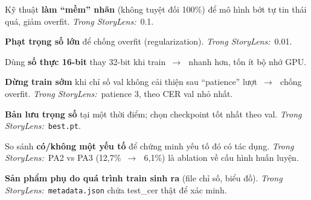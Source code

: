\documentclass[11pt]{article}
\newcommand{\arr}{\,\ensuremath{\rightarrow}\,}
\newcommand{\code}[1]{\texttt{\small #1}}
\newcommand{\insl}{\textit{\textcolor{steel}{Trong StoryLens:}}\ }
\begin{document}
\begin{terms}
\item[Label smoothing.] Kỹ thuật \textbf{làm ``mềm'' nhãn} (không tuyệt đối 100\%) để mô hình bớt tự tin thái quá, giảm overfit. \insl 0.1.
\item[Weight decay.] \textbf{Phạt trọng số lớn} để chống overfit (regularization). \insl 0.01.
\item[fp16 (mixed precision).] Dùng \textbf{số thực 16-bit} thay 32-bit khi train \arr\ nhanh hơn, tốn ít bộ nhớ GPU.
\item[Early stopping / Patience.] \textbf{Dừng train sớm} khi chỉ số val không cải thiện sau ``patience'' lượt \arr\ chống overfit. \insl patience 3, theo CER val nhỏ nhất.
\item[Checkpoint.] \textbf{Bản lưu trọng số} tại một thời điểm; chọn checkpoint tốt nhất theo val. \insl \code{best.pt}.
\item[Ablation study.] So sánh \textbf{có/không một yếu tố} để chứng minh yếu tố đó có tác dụng. \insl PA2 vs PA3 (12,7\% \arr\ 6,1\%) là ablation về cấu hình huấn luyện.
\item[Metadata / Artifact.] \textbf{Sản phẩm phụ do quá trình train sinh ra} (file chỉ số, biểu đồ). \insl \code{metadata.json} chứa test\_cer thật để xác minh.
\end{terms}
\end{document}
